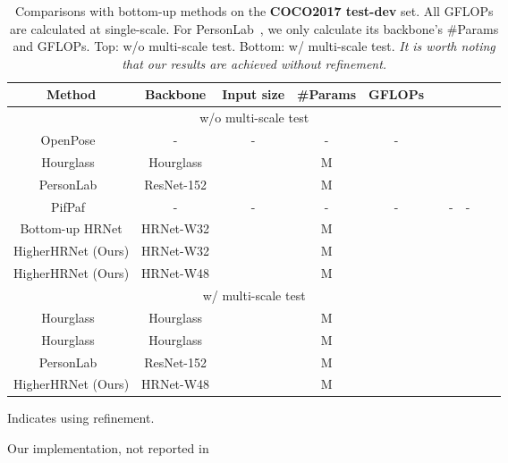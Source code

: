 \documentclass[10pt,twocolumn,letterpaper]{article}
\begin{document}
\begin{table*}[t]
\begin{threeparttable}
\centering
\setlength{\tabcolsep}{10.0pt}
\footnotesize
\begin{tabular}{c|c|c|c|c|ccccc}
Method & Backbone & Input size & \#Params & GFLOPs & 
 &  &  &  & \\
\hline
\multicolumn{10}{c}{w/o multi-scale test}\\
\hline
OpenPose~\cite{cao2017realtime}\tnote{\textdagger} & - & - & - & - & &  &  &  & \\
Hourglass~\cite{newwell2017associative} & Hourglass &  & M&  & & &&&\\
PersonLab~\cite{papandreou2018personlab} & ResNet-152 &  &M&  & & &&&\\
PifPaf~\cite{kreiss2019pifpaf} & - & - & - & - &  & - & - &  & \\
Bottom-up HRNet\tnote{\textdaggerdbl}& HRNet-W32&&M&
&&&&&\\
HigherHRNet (Ours)& HRNet-W32&&M&
&&&&&\\
HigherHRNet (Ours)& HRNet-W48 &&M&
&&&&&\\
\hline
\multicolumn{10}{c}{w/ multi-scale test}\\
\hline
Hourglass~\cite{newwell2017associative} & Hourglass &  & M& 
& & &&&\\
Hourglass~\cite{newwell2017associative}\tnote{\textdagger} & Hourglass &  & M& 
& & &&&\\
PersonLab~\cite{papandreou2018personlab}  & ResNet-152 & &M& 
&& &&&\\
HigherHRNet (Ours)& HRNet-W48&&M&
&&&&&\\
\end{tabular}
\begin{tablenotes}
\item[\textdagger] {\scriptsize Indicates using refinement.}
\item[\textdaggerdbl] {\scriptsize Our implementation, not reported in \cite{sun2019deep,WangSCJDZLMTWLX19}}
\end{tablenotes}
\end{threeparttable}
\caption{Comparisons with bottom-up methods on the \textbf{COCO2017 test-dev} set. All GFLOPs are calculated at single-scale. For PersonLab~\cite{papandreou2018personlab}, we only calculate its backbone's \#Params and GFLOPs. Top: w/o multi-scale test. Bottom: w/ multi-scale test. \emph{It is worth noting that our results are achieved without refinement.}}
\label{table:coco_test_dev_bu}
\end{table*}
\end{document}
